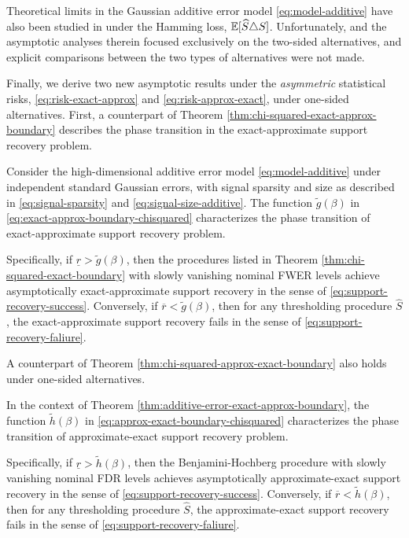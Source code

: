 Theoretical limits in the Gaussian additive error model \eqref{eq:model-additive} have also been studied in \cite{butucea2018variable} under the Hamming loss, ${\mathbb E}[\widehat{S}\triangle S]$.
Unfortunately, and the asymptotic analyses therein focused exclusively on the two-sided alternatives, and explicit comparisons between the two types of alternatives were not made.

Finally, we derive two new asymptotic results under the \emph{asymmetric} statistical risks, \eqref{eq:risk-exact-approx} and \eqref{eq:risk-approx-exact}, under one-sided alternatives.
First, a counterpart of Theorem \ref{thm:chi-squared-exact-approx-boundary} describes the phase transition in the exact-approximate support recovery problem.

\begin{theorem} \label{thm:additive-error-exact-approx-boundary}
Consider the high-dimensional additive error model \eqref{eq:model-additive} under independent standard Gaussian errors, with signal sparsity and size as described in \eqref{eq:signal-sparsity} and \eqref{eq:signal-size-additive}.
The function $\widetilde{g}(\beta)$ in \eqref{eq:exact-approx-boundary-chisquared} characterizes the phase transition of exact-approximate support recovery problem.

Specifically, if $\underline{r} > \widetilde{g}(\beta)$, then the procedures listed in Theorem \ref{thm:chi-squared-exact-boundary} with slowly vanishing nominal FWER levels achieve asymptotically exact-approximate support recovery in the sense of \eqref{eq:support-recovery-success}. 
Conversely, if $\overline{r} < \widetilde{g}(\beta)$, then for any thresholding procedure $\widehat{S}$, the exact-approximate support recovery fails in the sense of \eqref{eq:support-recovery-faliure}.
\end{theorem}

A counterpart of Theorem \ref{thm:chi-squared-approx-exact-boundary} also holds under one-sided alternatives.

\begin{theorem} \label{thm:additive-error-approx-exact-boundary}
In the context of Theorem \ref{thm:additive-error-exact-approx-boundary}, the function $\widetilde{h}(\beta)$ in \eqref{eq:approx-exact-boundary-chisquared}
characterizes the phase transition of approximate-exact support recovery problem.

Specifically, if $\underline{r} > \widetilde{h}(\beta)$, then the Benjamini-Hochberg procedure with slowly vanishing nominal FDR levels achieves asymptotically approximate-exact support recovery in the sense of \eqref{eq:support-recovery-success}. 
Conversely, if $\overline{r} < \widetilde{h}(\beta)$, then for any thresholding procedure $\widehat{S}$, the approximate-exact support recovery fails in the sense of \eqref{eq:support-recovery-faliure}.
\end{theorem}

